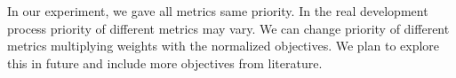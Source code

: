 \documentclass[letterpaper, 10 pt, conference]{ieeeconf}  %
\begin{document}
In our experiment, we gave all metrics same priority. In the real development process priority of different metrics may vary. We can change priority of different metrics multiplying weights with the normalized objectives. We plan to explore this in future and include more objectives from literature.



\end{document}
